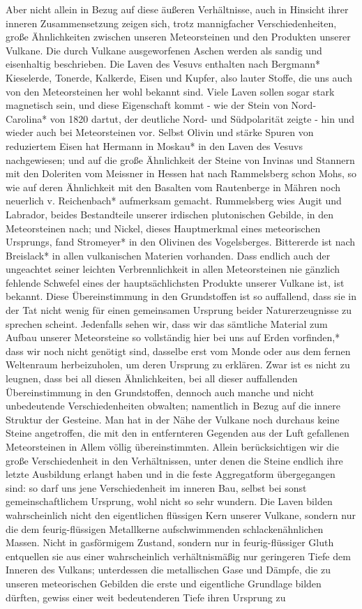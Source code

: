 \documentclass[a4paper, 11pt, oneside, polutonikogreek, german]{article}
\begin{document}
Aber nicht allein in Bezug auf diese äußeren Verhältnisse, auch in Hinsicht ihrer inneren Zusammensetzung zeigen sich, trotz mannigfacher Verschiedenheiten, große Ähnlichkeiten zwischen unseren Meteorsteinen und den Produkten unserer Vulkane. Die durch Vulkane ausgeworfenen Aschen werden als sandig und eisenhaltig beschrieben. Die Laven des Vesuvs enthalten nach Bergmann* Kieselerde, Tonerde, Kalkerde, Eisen und Kupfer, also lauter Stoffe, die uns auch von den Meteorsteinen her wohl bekannt sind. Viele Laven sollen sogar stark magnetisch sein, und diese Eigenschaft kommt - wie der Stein von Nord-Carolina* von 1820 dartut, der deutliche Nord- und Südpolarität zeigte - hin und wieder auch bei Meteorsteinen vor. Selbst Olivin und stärke Spuren von reduziertem Eisen hat Hermann in Moskau* in den Laven des Vesuvs nachgewiesen; und auf die große Ähnlichkeit der Steine von Invinas und Stannern mit den Doleriten vom Meissner in Hessen hat nach Rammelsberg schon Mohs, so wie auf deren Ähnlichkeit mit den Basalten vom Rautenberge in Mähren noch neuerlich v. Reichenbach* aufmerksam gemacht. Rummelsberg wies Augit und Labrador, beides Bestandteile unserer irdischen plutonischen Gebilde, in den Meteorsteinen nach; und Nickel, dieses Hauptmerkmal eines meteorischen Ursprungs, fand Stromeyer* in den Olivinen des Vogelsberges. Bittererde ist nach Breislack* in allen vulkanischen Materien vorhanden. Dass endlich auch der ungeachtet seiner leichten Verbrennlichkeit in allen Meteorsteinen nie gänzlich fehlende Schwefel eines der hauptsächlichsten Produkte unserer Vulkane ist, ist bekannt. Diese Übereinstimmung in den Grundstoffen ist so auffallend, dass sie in der Tat nicht wenig für einen gemeinsamen Ursprung beider Naturerzeugnisse zu sprechen scheint. Jedenfalls sehen wir, dass wir das sämtliche Material zum Aufbau unserer Meteorsteine so vollständig hier bei uns auf Erden vorfinden,* dass wir noch nicht genötigt sind, dasselbe erst vom Monde oder aus dem fernen Weltenraum herbeizuholen, um deren Ursprung zu erklären. Zwar ist es nicht zu leugnen, dass bei all diesen Ähnlichkeiten, bei all dieser auffallenden Übereinstimmung in den Grundstoffen, dennoch auch manche und nicht unbedeutende Verschiedenheiten obwalten; namentlich in Bezug auf die innere Struktur der Gesteine. Man hat in der Nähe der Vulkane noch durchaus keine Steine angetroffen, die mit den in entfernteren Gegenden aus der Luft gefallenen Meteorsteinen in Allem völlig übereinstimmten. Allein berücksichtigen wir die große Verschiedenheit in den Verhältnissen, unter denen die Steine endlich ihre letzte Ausbildung erlangt haben und in die feste Aggregatform übergegangen sind: so darf uns jene Verschiedenheit im inneren Bau, selbst bei sonst gemeinschaftlichem Ursprung, wohl nicht so sehr wundern. Die Laven bilden wahrscheinlich nicht den eigentlichen flüssigen Kern unserer Vulkane, sondern nur die dem feurig-flüssigen Metallkerne aufschwimmenden schlackenähnlichen Massen. Nicht in gasförmigem Zustand, sondern nur in feurig-flüssiger Gluth entquellen sie aus einer wahrscheinlich verhältnismäßig nur geringeren Tiefe dem Inneren des Vulkans; unterdessen die metallischen Gase und Dämpfe, die zu unseren meteorischen Gebilden die erste und eigentliche Grundlage bilden dürften, gewiss einer weit bedeutenderen Tiefe ihren Ursprung zu 
\end{document}
